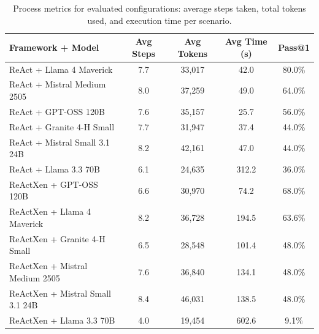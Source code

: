 \begin{table}[t]
\caption{Process metrics for evaluated configurations: average steps taken, total tokens used, and execution time per scenario.}
\label{tab:process_metrics}
\centering\small
\begin{tabular}{lcccc}
\toprule
\textbf{Framework + Model} & \textbf{Avg Steps} & \textbf{Avg Tokens} & \textbf{Avg Time (s)} & \textbf{Pass@1} \\
\midrule
ReAct + Llama 4 Maverick & 7.7 & 33,017 & 42.0 & 80.0\% \\
ReAct + Mistral Medium 2505 & 8.0 & 37,259 & 49.0 & 64.0\% \\
ReAct + GPT-OSS 120B & 7.6 & 35,157 & 25.7 & 56.0\% \\
ReAct + Granite 4-H Small & 7.7 & 31,947 & 37.4 & 44.0\% \\
ReAct + Mistral Small 3.1 24B & 8.2 & 42,161 & 47.0 & 44.0\% \\
ReAct + Llama 3.3 70B & 6.1 & 24,635 & 312.2 & 36.0\% \\
ReActXen + GPT-OSS 120B & 6.6 & 30,970 & 74.2 & 68.0\% \\
ReActXen + Llama 4 Maverick & 8.2 & 36,728 & 194.5 & 63.6\% \\
ReActXen + Granite 4-H Small & 6.5 & 28,548 & 101.4 & 48.0\% \\
ReActXen + Mistral Medium 2505 & 7.6 & 36,840 & 134.1 & 48.0\% \\
ReActXen + Mistral Small 3.1 24B & 8.4 & 46,031 & 138.5 & 48.0\% \\
ReActXen + Llama 3.3 70B & 4.0 & 19,454 & 602.6 & 9.1\% \\
\bottomrule
\end{tabular}
\end{table}